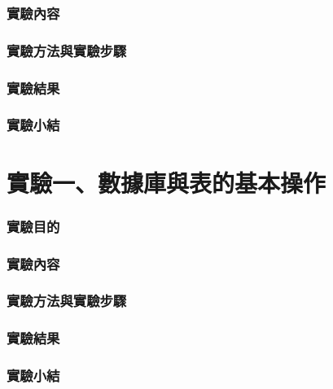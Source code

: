 \documentclass[12pt, a4paper]{report}
\begin{document}
\section{實驗內容}

\section{實驗方法與實驗步驟}

\section{實驗結果}

\section{實驗小結}

\part{實驗一、數據庫與表的基本操作}

\section{實驗目的}



\section{實驗內容}

\section{實驗方法與實驗步驟}

\section{實驗結果}

\section{實驗小結}
\end{document}
